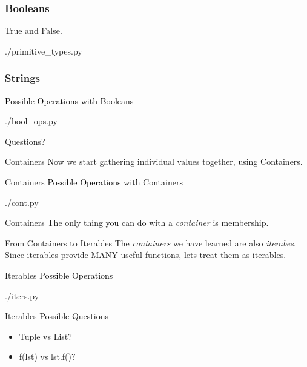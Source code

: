 \documentclass{beamer}
\begin{document}
\begin{frame}
  \frametitle{Booleans}
  True and False.
  \begin{lstinputlisting}[firstline=14, lastline=15]
    {./primitive_types.py}
  \end{lstinputlisting}
\end{frame}

\begin{frame}
  \frametitle{Strings}
  \textcolor{black}{\large{Possible Operations with Booleans}}
  \begin{lstinputlisting}
    {./bool_ops.py}
  \end{lstinputlisting}
\end{frame}

\begin{frame}[plain, c]
  \begin{center}
    Questions?
  \end{center}
\end{frame}

\begin{frame}{Containers}
  Now we start gathering individual values together,
  using Containers.
\end{frame}

\begin{frame}{Containers}
  \textcolor{black}{\large{Possible Operations with Containers}}
  \begin{lstinputlisting}
    {./cont.py}
  \end{lstinputlisting}
\end{frame}

\begin{frame}{Containers}
  The only thing you can do with a \textit{container} is membership.
\end{frame}

\begin{frame}{From Containers to Iterables}
  The \textit{containers} we have learned are also \textit{iterabes}.
  Since iterables provide MANY useful functions, lets treat them as iterables.
\end{frame}


\begin{frame}{Iterables}
  \textcolor{black}{\large{Possible Operations}}
  \begin{lstinputlisting}[firstline=4, lastline=19]
    {./iters.py}
  \end{lstinputlisting}
\end{frame}

\begin{frame}{Iterables}
  \textcolor{black}{\large{Possible Questions}}
  \begin{itemize}
    \item Tuple vs List?
    \item f(lst) vs lst.f()?
  \end{itemize}
\end{frame}
\end{document}
